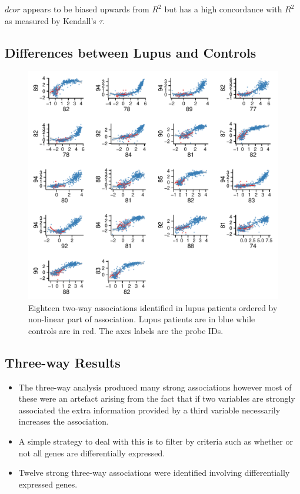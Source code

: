 \documentclass[a4paper, landscape, 20pt]{extreport}
\begin{document}
$dcor$ appears to be biased upwards from $R^2$ but has a high concordance with $R^2$ as measured by Kendall's $\tau$. 
\newpage
\subsection*{\color{Blue} Differences between Lupus and Controls}

\begin{figure}[H]
	\begin{center}
		\includegraphics[width=12cm]{2wayTop}
\caption{Eighteen two-way associations identified in lupus patients ordered by non-linear part of association. Lupus patients are in blue while controls are in red. The axes labels are the probe IDs.}
	\end{center}
\end{figure}

\subsection*{\color{Blue} Three-way Results}

\begin{itemize}
\item The three-way analysis produced many strong associations however most of these were an artefact arising from the fact that if two variables are strongly associated the extra information provided by a third variable necessarily increases the association. 

\item A simple strategy to deal with this is to filter by criteria such as whether or not all genes are differentially expressed.
\item Twelve strong three-way associations were identified involving differentially expressed genes.

\end{itemize}
\end{document}
